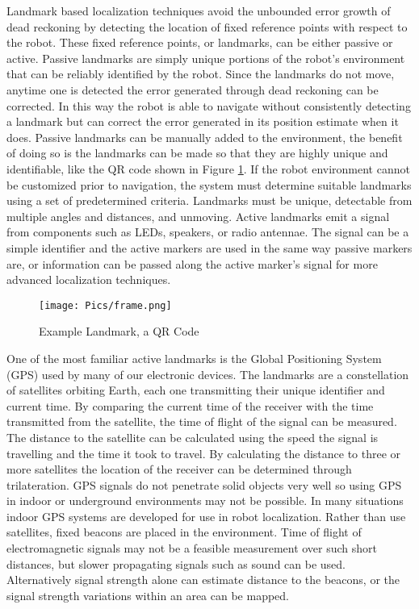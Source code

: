 Landmark based localization techniques avoid the unbounded error growth of dead reckoning by detecting the location of fixed reference points with respect to the robot. These fixed reference points, or landmarks, can be either passive or active. Passive landmarks are simply unique portions of the robot's environment that can be reliably identified by the robot. Since the landmarks do not move, anytime one is detected the error generated through dead reckoning can be corrected. In this way the robot is able to navigate without consistently detecting a landmark but can correct the error generated in its position estimate when it does. Passive landmarks can be manually added to the environment, the benefit of doing so is the landmarks can be made so that they are highly unique and identifiable, like the QR code shown in Figure \ref{fig:qr}. If the robot environment cannot be customized prior to navigation, the system must determine suitable landmarks using a set of predetermined criteria. Landmarks must be unique, detectable from multiple angles and distances, and unmoving. Active landmarks emit a signal from components such as LEDs, speakers, or radio antennae. The signal can be a simple identifier and the active markers are used in the same way passive markers are, or information can be passed along the active marker's signal for more advanced localization techniques.\\

\begin{figure}
    \centering
    \texttt{[image: Pics/frame.png]}
    \caption{Example Landmark, a QR Code}
    \label{fig:qr}
\end{figure}

One of the most familiar active landmarks is the Global Positioning System (GPS) used by many of our electronic devices. The landmarks are a constellation of satellites orbiting Earth, each one transmitting their unique identifier and current time. By comparing the current time of the receiver with the time transmitted from the satellite, the time of flight of the signal can be measured. The distance to the satellite can be calculated using the speed the signal is travelling and the time it took to travel. By calculating the distance to three or more satellites the location of the receiver can be determined through trilateration. GPS signals do not penetrate solid objects very well so using GPS in indoor or underground environments may not be possible. In many situations indoor GPS systems are developed for use in robot localization. Rather than use satellites, fixed beacons are placed in the environment. Time of flight of electromagnetic signals may not be a feasible measurement over such short distances, but slower propagating signals such as sound can be used. Alternatively signal strength alone can estimate distance to the beacons, or the signal strength variations within an area can be mapped.\\

